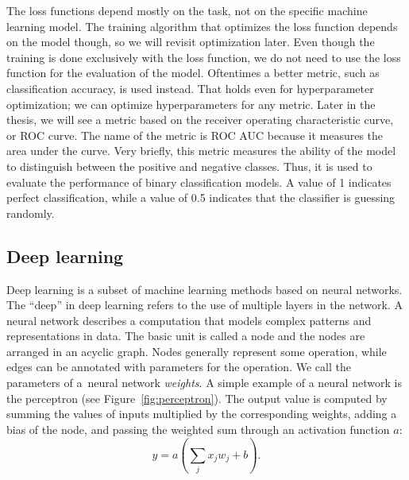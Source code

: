 The loss functions depend mostly on the task, not on the specific machine learning model. The training algorithm that optimizes the loss function depends on the model though, so we will revisit optimization later. Even though the training is done exclusively with the loss function, we do not need to use the loss function for the evaluation of the model. Oftentimes a better metric, such as classification accuracy, is used instead. That holds even for hyperparameter optimization; we can optimize hyperparameters for any metric. Later in the thesis, we will see a metric based on the receiver operating characteristic curve, or ROC curve. The name of the metric is ROC AUC because it measures the area under the curve. Very briefly, this metric measures the ability of the model to distinguish between the positive and negative classes. Thus, it is used to evaluate the performance of binary classification models. A value of 1 indicates perfect classification, while a value of 0.5 indicates that the classifier is guessing randomly.

\subsection{Deep learning}
Deep learning is a subset of machine learning methods based on neural networks. The ``deep'' in deep learning refers to the use of multiple layers in the network. A neural network describes a computation that models complex patterns and representations in data. The basic unit is called a node and the nodes are arranged in an acyclic graph. Nodes generally represent some operation, while edges can be annotated with parameters for the operation. We call the parameters of a~neural network \textit{weights}. A simple example of a neural network is the perceptron (see Figure~\ref{fig:perceptron}). The output value is computed by summing the values of inputs multiplied by the corresponding weights, adding a bias of the node, and passing the weighted sum through an activation function $a$:
\begin{equation}
y = a(\sum_j x_jw_j + b).
\label{eq:node}
\end{equation}

